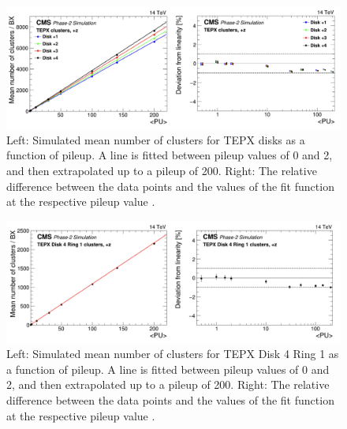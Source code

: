 

\begin{figure}[H]
  \centering
  \includegraphics[width=1\columnwidth]{ashish_thesis/michigan_2.png}
  \caption[TEPX cluster linear fit per disk]{\onehalfspacing Left: Simulated mean number of clusters for TEPX disks as a function of pileup. A line is fitted between pileup values of 0 and 2, and then extrapolated up to a pileup of 200. Right: %
    The relative difference between the data points and the values of the fit function at the respective pileup value \cite{Collaboration:275907420}.}
  \label{fig:CMS_4205}
\end{figure}


\begin{figure}[H]
  \centering
  \includegraphics[width=1\columnwidth]{ashish_thesis/michigan_3.png}
  \caption[TEPX clusters linear fit]{\onehalfspacing Left: Simulated mean number of clusters for  TEPX Disk 4 Ring 1 as a function of pileup. A line is fitted between pileup values of 0 and 2, and then extrapolated up to a pileup of 200. Right: %
    The relative difference between the data points and the values of the fit function at the respective pileup value \cite{Collaboration:275907420}. }
  \label{fig:CMS_4206}
\end{figure}



